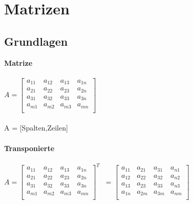 



\chapter{Matrizen}

\section{Grundlagen}
\textbf{Matrize} \\
\\
$A = 
\begin{bmatrix}
a_{11} & a_{12} & a_{13} & a_{1n} \\
a_{21} & a_{22}& a_{23} & a_{2n} \\
a_{31} & a_{32} & a_{33} & a_{3n} \\
a_{m1} & a_{m2} & a_{m3} & a_{mn} \\
\end{bmatrix}
$   
\\
\\
A = [Spalten,Zeilen]
\\
\\
\textbf{Transponierte} \\
\\
$A = 
\begin{bmatrix}
a_{11} & a_{12} & a_{13} & a_{1n} \\
a_{21} & a_{22}& a_{23} & a_{2n} \\
a_{31} & a_{32} & a_{33} & a_{3n} \\
a_{m1} & a_{m2} & a_{m3} & a_{mn} \\
\end{bmatrix}^T
$  
\
=
$\begin{bmatrix}
a_{11} & a_{21} & a_{31} & a_{n1} \\
a_{12} & a_{22} & a_{32} & a_{n2} \\
a_{13} & a_{23} & a_{33} & a_{n3} \\
a_{1n} & a_{2m} & a_{3m} & a_{nm} \\
\end{bmatrix}
$  
